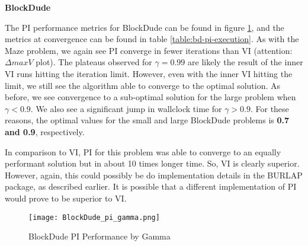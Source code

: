 \documentclass{article}
\begin{document}
\textbf{BlockDude}

The PI performance metrics for BlockDude can be found in figure \ref{fig:bd-pi}, and the metrics at convergence can be
found in table \ref{table:bd-pi-execution}. As with the Maze problem, we again see PI converge in fewer iterations than VI (attention:
$\Delta maxV$ plot). The plateaus observed for $\gamma = 0.99$ are likely the result of the inner VI runs hitting the
iteration limit. However, even with the inner VI hitting the limit, we still see the algorithm able to converge to the
optimal solution. As before, we see convergence to a sub-optimal solution for the large problem when $\gamma < 0.9$. We
also see a significant jump in wallclock time for $\gamma > 0.9$. For these reasons, the optimal values for the small and
large BlockDude problems is \textbf{0.7 and 0.9}, respectively.

In comparison to VI, PI for this problem was able to converge to an equally performant solution but in about 10 times longer
time. So, VI is clearly superior. However, again, this could possibly be do implementation details in the BURLAP package, as
described earlier. It is possible that a different implementation of PI would prove to be superior to VI.

\begin{figure}
    \centering
    \texttt{[image: BlockDude\_pi\_gamma.png]}
    \caption{BlockDude PI Performance by Gamma}
    \label{fig:bd-pi}
\end{figure}
\end{document}

